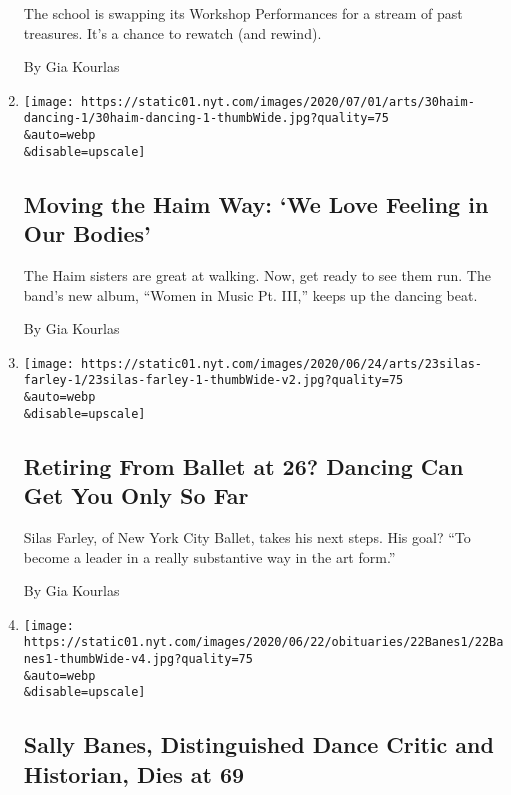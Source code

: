 \begin{enumerate}
  The school is swapping its Workshop Performances for a stream of past
  treasures. It's a chance to rewatch (and rewind).

  By Gia Kourlas
\item
  \href{/2020/06/30/arts/dance/haim-dance-videos.html}{}

  \texttt{[image: https://static01.nyt.com/images/2020/07/01/arts/30haim-dancing-1/30haim-dancing-1-thumbWide.jpg?quality=75\\\&auto=webp\\\&disable=upscale]}

  \hypertarget{moving-the-haim-way-we-love-feeling-in-our-bodies}{%
  \subsection{Moving the Haim Way: `We Love Feeling in Our
  Bodies'}\label{moving-the-haim-way-we-love-feeling-in-our-bodies}}

  The Haim sisters are great at walking. Now, get ready to see them run.
  The band's new album, ``Women in Music Pt. III,'' keeps up the dancing
  beat.

  By Gia Kourlas
\item
  \href{/2020/06/23/arts/dance/silas-farley-new-york-city-ballet.html}{}

  \texttt{[image: https://static01.nyt.com/images/2020/06/24/arts/23silas-farley-1/23silas-farley-1-thumbWide-v2.jpg?quality=75\\\&auto=webp\\\&disable=upscale]}

  \hypertarget{retiring-from-ballet-at-26-dancing-can-get-you-only-so-far}{%
  \subsection{Retiring From Ballet at 26? Dancing Can Get You Only So
  Far}\label{retiring-from-ballet-at-26-dancing-can-get-you-only-so-far}}

  Silas Farley, of New York City Ballet, takes his next steps. His goal?
  ``To become a leader in a really substantive way in the art form.''

  By Gia Kourlas
\item
  \href{/2020/06/21/arts/dance/sally-banes-dead.html}{}

  \texttt{[image: https://static01.nyt.com/images/2020/06/22/obituaries/22Banes1/22Banes1-thumbWide-v4.jpg?quality=75\\\&auto=webp\\\&disable=upscale]}

  \hypertarget{sally-banes-distinguished-dance-critic-and-historian-dies-at-69}{%
  \subsection{Sally Banes, Distinguished Dance Critic and Historian,
  Dies at
  69}\label{sally-banes-distinguished-dance-critic-and-historian-dies-at-69}}


\end{enumerate}
